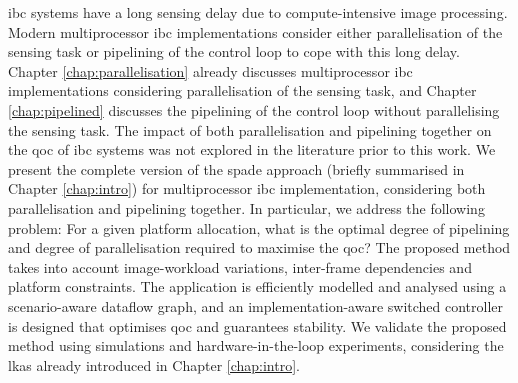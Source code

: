 \Gls{ibc} systems have a long sensing delay due to compute-intensive image processing.
Modern multiprocessor \gls{ibc} implementations consider either parallelisation of the sensing task or pipelining of the control loop to cope with this long delay.
Chapter \ref{chap:parallelisation} already discusses multiprocessor \gls{ibc} implementations considering parallelisation of the sensing task, and
Chapter \ref{chap:pipelined} discusses the pipelining of the control loop without parallelising the sensing task.
The impact of both parallelisation and pipelining together on the \gls{qoc} of \gls{ibc} systems was not explored in the literature prior to this work.
We present the complete version of the \gls{spade} approach (briefly summarised in Chapter \ref{chap:intro}) for multiprocessor \gls{ibc} implementation, considering both parallelisation and pipelining together. 
In particular, we address the following problem: For a given platform allocation, what is the optimal degree of pipelining and degree of parallelisation required to maximise the \gls{qoc}?
The proposed method takes into account image-workload variations, inter-frame dependencies and platform constraints.
The application is efficiently modelled and analysed using a scenario-aware dataflow graph, and an implementation-aware switched controller is designed that optimises \gls{qoc} and guarantees stability.
We validate the proposed method using simulations and hardware-in-the-loop experiments, considering the \gls{lkas} already introduced in Chapter \ref{chap:intro}.